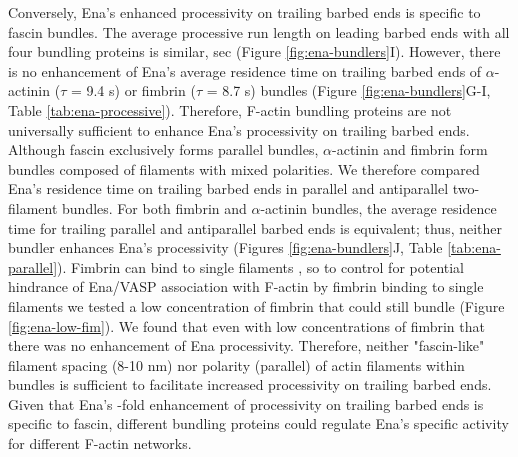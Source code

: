 Conversely, Ena's enhanced processivity on trailing barbed ends is specific to fascin bundles. The average processive run length on leading barbed ends with all four bundling proteins is similar,  sec (Figure \ref{fig:ena-bundlers}I). However, there is no enhancement of Ena's average residence time on trailing barbed ends of $\alpha$-actinin ($\tau$ = 9.4 s) or fimbrin ($\tau$ = 8.7 s) bundles (Figure \ref{fig:ena-bundlers}G-I, Table \ref{tab:ena-processive}). Therefore, F-actin bundling proteins are not universally sufficient to enhance Ena's processivity on trailing barbed ends. Although fascin exclusively forms parallel bundles, $\alpha$-actinin and fimbrin form bundles composed of filaments with mixed polarities. We therefore compared Ena's residence time on trailing barbed ends in parallel and antiparallel two-filament bundles. For both fimbrin and $\alpha$-actinin bundles, the average residence time for trailing parallel and antiparallel barbed ends is equivalent; thus, neither bundler enhances Ena's processivity (Figures \ref{fig:ena-bundlers}J, Table \ref{tab:ena-parallel}). Fimbrin can bind to single filaments \citep{skau_actin_2011}, so to control for potential hindrance of Ena/VASP association with F-actin by fimbrin binding to single filaments we tested a low concentration of fimbrin that could still bundle (Figure \ref{fig:ena-low-fim}). We found that even with low concentrations of fimbrin that there was no enhancement of Ena processivity. Therefore, neither "fascin-like" filament spacing (8-10 nm) nor polarity (parallel) of actin filaments within bundles is sufficient to facilitate increased processivity on trailing barbed ends. Given that Ena's -fold enhancement of processivity on trailing barbed ends is specific to fascin, different bundling proteins could regulate Ena's specific activity for different F-actin networks. 


